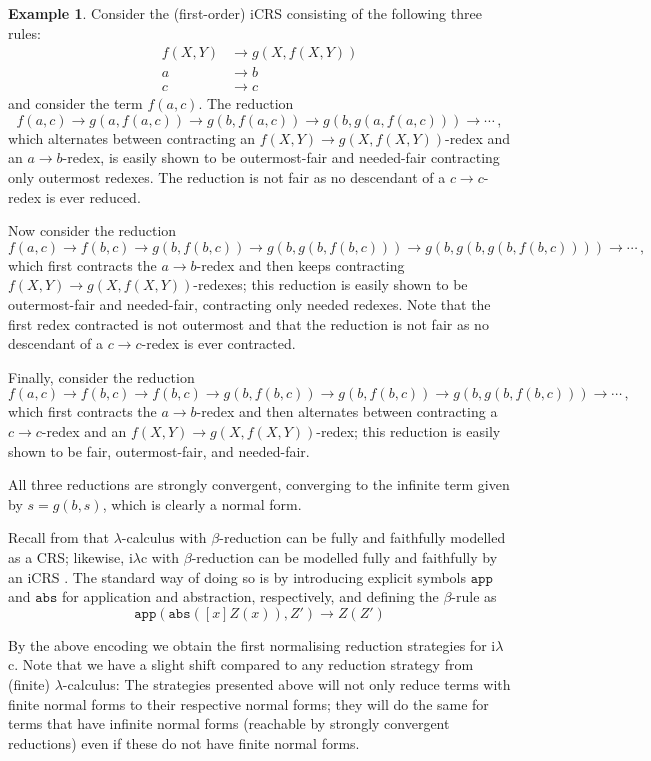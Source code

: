 \documentclass{LMCS}
\theoremstyle{definition}
\newtheorem{example}[thm]{Example}
\newcommand{\rew}{\rightarrow}
\newcommand{\iLC}{i$\lambda$c\xspace}
\begin{document}
\begin{example}\label{ex:normal_one}
Consider the (first-order) iCRS consisting of the following three rules:
\begin{align*}
f(X,Y) & \rew g(X, f(X, Y)) \\
a      & \rew b \\
c      & \rew c
\end{align*}
and consider the term $f(a,c)$. The reduction
\[
f(a, c) \rew g(a ,f(a,c)) \rew g(b,f(a,c)) \rew g(b,g(a,f(a,c))) \rew \cdots \, ,
\]
which alternates between contracting an $f(X, Y) \rew g(X, f(X, Y))$-redex and an $a \rew b$-redex, is easily shown to be outermost-fair and needed-fair contracting only outermost redexes. The reduction is not fair as no descendant of a $c \rew c$-redex is ever reduced.

Now consider the reduction
\[
f(a, c) \rew f(b, c) \rew g(b ,f(b,c)) \rew g(b,g(b,f(b,c))) \rew g(b, g(b, g(b, f(b, c)))) \rew \cdots \, ,
\]
which first contracts the $a \rew b$-redex and then keeps contracting $f(X, Y) \rew g(X, f(X, Y))$-redexes; this reduction is easily shown to be outermost-fair and needed-fair, contracting only needed redexes. Note that the first redex contracted is not outermost and that the reduction is not fair as no descendant of a $c \rew c$-redex is ever contracted.

Finally, consider the reduction
\[
f(a, c) \rew f(b, c) \rew f(b, c) \rew g(b,f(b,c)) \rew g(b,f(b,c)) \rew g(b,g(b,f(b,c))) \rew \cdots \, ,
\]
which first contracts the $a \rew b$-redex and then alternates between contracting a $c \rew c$-redex and an $f(X, Y) \rew g(X, f(X, Y))$-redex; this reduction is easily shown to be fair, outermost-fair, and needed-fair.

All three reductions are strongly convergent, converging to the infinite term given by $s = g(b, s)$, which is clearly a normal form.
\end{example}



Recall from \cite{KOR93,T03} that $\lambda$-calculus with $\beta$-reduction 
can be fully and faithfully modelled as a CRS; likewise, \iLC with $\beta$-reduction can be modelled fully and faithfully by an iCRS \cite{JJ05a,paper_i}. The standard way of doing so is by introducing explicit symbols $\mathtt{app}$ and $\mathtt{abs}$ for application and abstraction, respectively, and defining the $\beta$-rule as
\[
\mathtt{app}(\mathtt{abs}([x]Z(x)),Z') \rightarrow Z(Z')
\]

By the above encoding we obtain the first normalising reduction strategies for \iLC. Note that we have a slight shift compared to any reduction strategy from (finite) $\lambda$-calculus: The strategies presented above will not only reduce terms with finite normal forms to their respective normal forms; they will do the same for terms that have infinite normal forms (reachable by strongly convergent reductions) even if these do not have finite normal forms.
\end{document}
